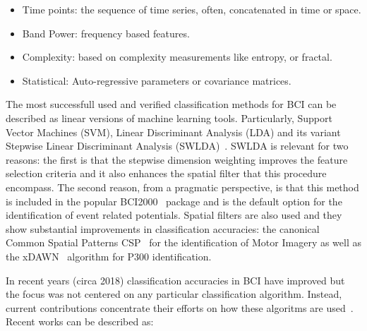 \begin{itemize}
\item Time points:  the sequence of time series, often, concatenated in time or space.
\item Band Power: frequency based features.
\item Complexity:  based on complexity measurements like entropy, or fractal.
\item Statistical: Auto-regressive parameters or covariance matrices.
\end{itemize}

The most successfull used and verified classification methods for BCI \cite{Lotte2007} can be described as linear versions of machine learning tools.  Particularly, Support Vector Machines (SVM), Linear Discriminant Analysis (LDA) and its variant Stepwise Linear Discriminant Analysis (SWLDA)~\cite{Krusienski2006,Scholkopf2001}.  SWLDA is relevant for two reasons:  the first is that the stepwise dimension weighting improves the feature selection criteria and it also enhances the spatial filter that this procedure encompass.  The second reason, from a pragmatic perspective, is that this method is included in the popular BCI2000~\cite{Schalk2004} package and is the default option for the identification of event related potentials.  Spatial filters are also used and they show substantial improvements in classification accuracies: the canonical Common Spatial Patterns CSP~\cite{Kai2008} for the identification of Motor Imagery as well as the xDAWN~\cite{Ribet2009} algorithm for P300 identification.

In recent years (circa 2018) classification accuracies in BCI have improved but the focus was not centered on any particular classification algorithm.  Instead, current contributions concentrate their efforts on how these algoritms are used~\cite{Lotte2018}.  Recent works can be described as:

